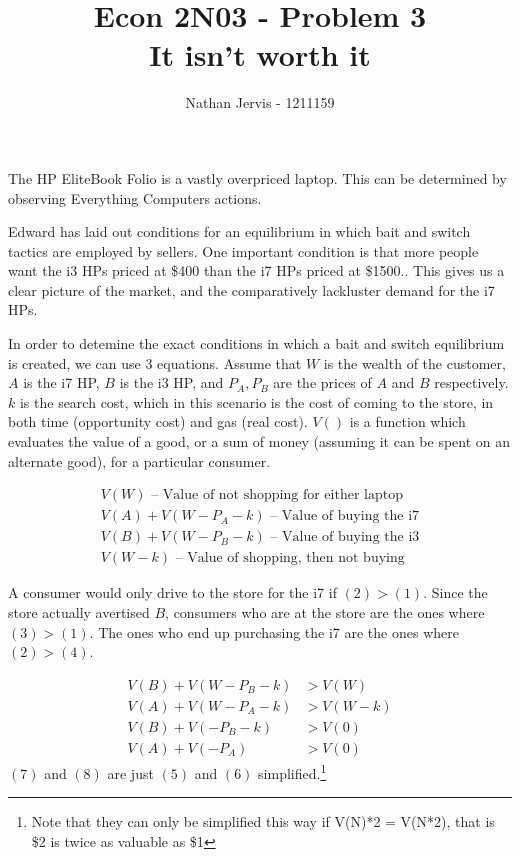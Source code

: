 \documentclass[12pt]{article}
\title{\vspace{-3.5cm}Econ 2N03 - Problem 3\\It isn't worth it}
\author{Nathan Jervis - 1211159}
\newcommand\explain[1]{\text{  --  #1}}
\begin{document}
\maketitle


The HP EliteBook Folio is a vastly overpriced laptop. This can be determined by observing Everything Computers actions.

Edward\cite{baitSwitch} has laid out conditions for an equilibrium in which bait and switch tactics are employed by sellers. One important condition is that more people want the i3 HPs priced at \$400 than the i7 HPs priced at \$1500.\cite[pg. 818]{baitSwitch}. This gives us a clear picture of the market, and the comparatively lackluster demand for the i7 HPs.

In order to detemine the exact conditions in which a bait and switch equilibrium is created, we can use 3 equations. Assume that $W$ is the wealth of the customer, $A$ is the i7 HP, $B$ is the i3 HP, and $P_A, P_B$ are the prices of $A$ and $B$ respectively. $k$ is the search cost, which in this scenario is the cost of coming to the store, in both time (opportunity cost) and gas (real cost). $V()$ is a function which evaluates the value of a good, or a sum of money (assuming it can be spent on an alternate good), for a particular consumer.

\begin{align}
	V(W) \explain{Value of not shopping for either laptop}\\
	V(A) + V(W-P_A - k) \explain{Value of buying the i7}\\
	V(B) + V(W-P_B - k) \explain{Value of buying the i3}\\
	V(W-k) \explain{Value of shopping, then not buying}
\end{align}

A consumer would only drive to the store for the i7 if $(2) > (1)$. Since the store actually avertised $B$, consumers who are at the store are the ones where $(3)>(1)$. The ones who end up purchasing the i7 are the ones where $(2)>(4)$.

\begin{align}
	V(B)+V(W-P_B-k) &> V(W)\\
	V(A)+V(W-P_A-k) &> V(W-k)\\
	V(B)+V(-P_B-k) &> V(0)\\
	V(A)+V(-P_A) &> V(0)
\end{align}
$(7)$ and $(8)$ are just $(5)$ and $(6)$ simplified.\footnote{Note that they can only be simplified this way if V(N)*2 = V(N*2), that is \$2 is twice as valuable as \$1}
\end{document}
